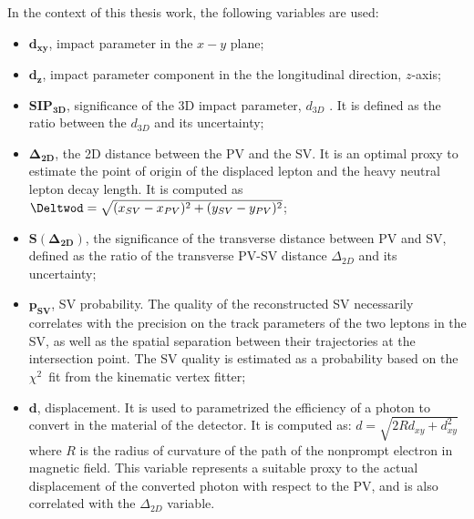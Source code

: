 In the context of this thesis work, the following variables are used:
\begin{itemize}
\item $\boldsymbol{d_{xy}}$, impact parameter in the $x-y$ plane;
\item $\boldsymbol{d_z}$, impact parameter component in the the
  longitudinal direction, $z$-axis;
\item $\boldsymbol{SIP_{3D}}$, significance of the 3D impact parameter, $d_{3D}$
 . It is defined as the ratio between the $d_{3D}$ and its
  uncertainty; 
\item $\boldsymbol{\Delta_{2D}}$, the 2D distance between the PV and
  the SV. It is an optimal proxy to estimate the point of origin of the
displaced lepton and the heavy neutral lepton decay length. It is
computed as $\Deltwod = \sqrt{(x_{SV}-x_{PV})^{2} + (y_{SV}-y_{PV})^{2}}$;
\item $\boldsymbol{ S(\Delta_{2D})}$, the significance of the transverse distance
  between PV and SV, defined as the ratio of the transverse PV-SV
  distance $\Delta_{2D}$ and its uncertainty;
\item $\boldsymbol{ p_{SV}}$, SV probability. The quality of the reconstructed SV
  necessarily correlates with the precision on the track parameters of
  the two leptons in the SV, as well as the spatial separation between their
  trajectories at the intersection point. The SV quality is estimated as a probability based on the
$\chi^2$~fit from the kinematic vertex fitter;
\item $\boldsymbol{d}$, displacement. It is used to parametrized the
  efficiency of a photon to convert in the material of the
  detector. It is computed as: $d = \sqrt{2R d_{xy}+d_{xy}^2}$ where $R$ is the radius of curvature of
  the path of the nonprompt electron in magnetic field. This variable represents a suitable
  proxy to the actual displacement of the converted photon with
respect to the PV, and is also correlated with the $\Delta_{2D}$ variable.
\end{itemize}


